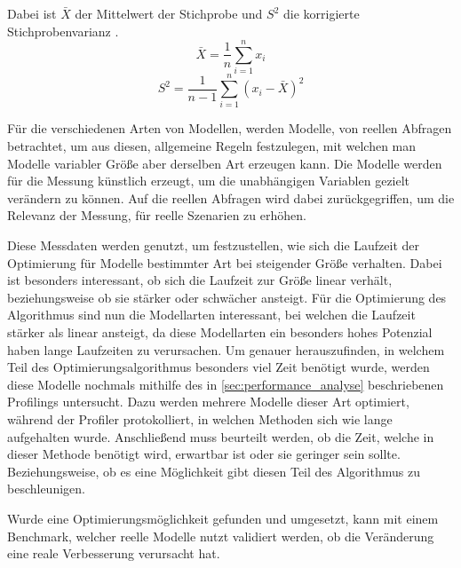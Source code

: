 \begin{equation*}
    [\bar{X} - t_{n-1,1-\alpha/2}\sqrt{S^2/n}, \bar{X} +
    t_{n-1,1-\alpha/2}\sqrt{S^2/n}]
\end{equation*}

Dabei ist $\bar{X}$ der Mittelwert der Stichprobe und $S^2$ die korrigierte
Stichprobenvarianz \autocites[vgl.][59, 502]{Statistik}. 
\begin{equation*}
    \bar{X} = \frac{1}{n} \displaystyle\sum^{n}_{i=1}x_i 
\end{equation*}
\begin{equation*}
    S^2 = \frac{1}{n-1}\displaystyle\sum^{n}_{i=1}(x_i-\bar{X})^2
\end{equation*}

Für die verschiedenen Arten von Modellen, werden Modelle, von reellen Abfragen
betrachtet, um aus diesen, allgemeine Regeln festzulegen, mit welchen man
Modelle variabler Größe aber derselben Art erzeugen kann. Die Modelle werden
für die Messung künstlich erzeugt, um die unabhängigen Variablen gezielt
verändern zu können. Auf die reellen Abfragen wird dabei zurückgegriffen, um
die Relevanz der Messung, für reelle Szenarien zu erhöhen.
\autocite[Vgl.][500f]{ExperimentalAnalysis}

Diese Messdaten werden genutzt, um festzustellen, wie sich die Laufzeit der
Optimierung für Modelle bestimmter Art bei steigender Größe verhalten. Dabei
ist besonders interessant, ob sich die Laufzeit zur Größe linear verhält,
beziehungsweise ob sie stärker oder schwächer ansteigt. Für die Optimierung des
Algorithmus sind nun die Modellarten interessant, bei welchen die Laufzeit
stärker als linear ansteigt, da diese Modellarten ein besonders hohes Potenzial
haben lange Laufzeiten zu verursachen. Um genauer herauszufinden, in welchem
Teil des Optimierungsalgorithmus besonders viel Zeit benötigt wurde, werden
diese Modelle nochmals mithilfe des in \autoref{sec:performance_analyse}
beschriebenen Profilings untersucht.
Dazu werden mehrere Modelle dieser Art
optimiert, während der Profiler protokolliert, in welchen Methoden sich wie
lange aufgehalten wurde. Anschließend muss beurteilt werden, ob die Zeit,
welche in dieser Methode benötigt wird, erwartbar ist oder sie geringer sein
sollte. Beziehungsweise, ob es eine Möglichkeit gibt diesen Teil des
Algorithmus zu beschleunigen.

Wurde eine Optimierungsmöglichkeit gefunden und umgesetzt, kann mit einem
Benchmark, welcher reelle Modelle nutzt validiert werden, ob die Veränderung
eine reale Verbesserung verursacht hat. 

